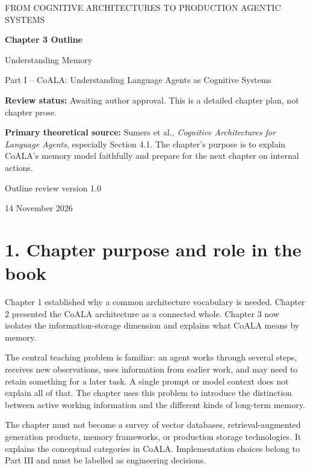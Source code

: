 


\thispagestyle{empty}
\begin{center}
{\sffamily\Large\color{BookBlue} FROM COGNITIVE ARCHITECTURES TO PRODUCTION AGENTIC SYSTEMS\par}
\vspace{1.2cm}
{\sffamily\huge\bfseries\color{BookBlue} Chapter 3 Outline\par}
\vspace{0.45cm}
{\sffamily\LARGE Understanding Memory\par}
\vspace{0.8cm}
{\large Part I -- CoALA: Understanding Language Agents as Cognitive Systems\par}
\vfill
\begin{learningbox}
\textbf{Review status:} Awaiting author approval. This is a detailed chapter plan, not chapter prose.

\textbf{Primary theoretical source:} Sumers et al., \emph{Cognitive Architectures for Language Agents}, especially Section 4.1. The chapter's purpose is to explain CoALA's memory model faithfully and prepare for the next chapter on internal actions.
\end{learningbox}
\vfill
{\sffamily\large Outline review version 1.0\par}
{\small 14 November 2026\par}
\end{center}
\clearpage
\section*{1. Chapter purpose and role in the book}
Chapter 1 established why a common architecture vocabulary is needed. Chapter 2 presented the CoALA architecture as a connected whole. Chapter 3 now isolates the information-storage dimension and explains what CoALA means by memory.

The central teaching problem is familiar: an agent works through several steps, receives new observations, uses information from earlier work, and may need to retain something for a later task. A single prompt or model context does not explain all of that. The chapter uses this problem to introduce the distinction between active working information and the different kinds of long-term memory.

The chapter must not become a survey of vector databases, retrieval-augmented generation products, memory frameworks, or production storage technologies. It explains the conceptual categories in CoALA. Implementation choices belong to Part III and must be labelled as engineering decisions.

